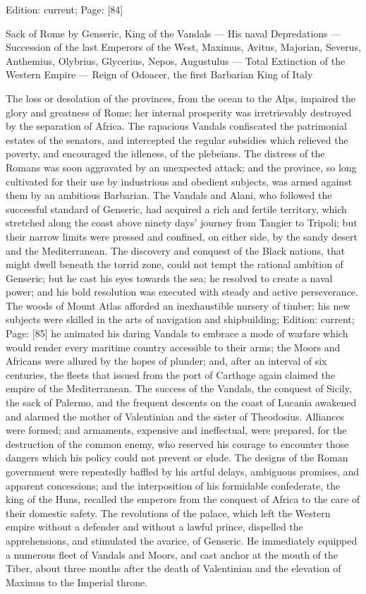 Edition: current; Page: [84]


Sack of Rome by Genseric, King of the Vandals \texthebrew{—} His naval Depredations \texthebrew{—} Succession of the last Emperors of the West, Maximus, Avitus, Majorian, Severus, Anthemius, Olybrius, Glycerius, Nepos, Augustulus \texthebrew{—} Total Extinction of the Western Empire \texthebrew{—} Reign of Odoacer, the first Barbarian King of Italy

The loss or desolation of the provinces, from the ocean to the Alps, impaired the glory and greatness of Rome; her internal prosperity was irretrievably destroyed by the separation of Africa. The rapacious Vandals confiscated the patrimonial estates of the senators, and intercepted the regular subsidies which relieved the poverty, and encouraged the idleness, of the plebeians. The distress of the Romans was soon aggravated by an unexpected attack; and the province, so long cultivated for their use by industrious and obedient subjects, was armed against them by an ambitious Barbarian. The Vandals and Alani, who followed the successful standard of Genseric, had acquired a rich and fertile territory, which stretched along the coast above ninety days\texthebrew{}’ journey from Tangier to Tripoli; but their narrow limits were pressed and confined, on either side, by the sandy desert and the Mediterranean. The discovery and conquest of the Black nations, that might dwell beneath the torrid zone, could not tempt the rational ambition of Genseric; but he cast his eyes towards the sea; he resolved to create a naval power; and his bold resolution was executed with steady and active perseverance. The woods of Mount Atlas afforded an inexhaustible nursery of timber; his new subjects were skilled in the arts of navigation and shipbuilding; Edition: current; Page: [85] he animated his daring Vandals to embrace a mode of warfare which would render every maritime country accessible to their arms; the Moors and Africans were allured by the hopes of plunder; and, after an interval of six centuries, the fleets that issued from the port of Carthage again claimed the empire of the Mediterranean. The success of the Vandals, the conquest of Sicily, the sack of Palermo, and the frequent descents on the coast of Lucania awakened and alarmed the mother of Valentinian and the sister of Theodosius. Alliances were formed; and armaments, expensive and ineffectual, were prepared, for the destruction of the common enemy, who reserved his courage to encounter those dangers which his policy could not prevent or elude. The designs of the Roman government were repeatedly baffled by his artful delays, ambiguous promises, and apparent concessions; and the interposition of his formidable confederate, the king of the Huns, recalled the emperors from the conquest of Africa to the care of their domestic safety. The revolutions of the palace, which left the Western empire without a defender and without a lawful prince, dispelled the apprehensions, and stimulated the avarice, of Genseric. He immediately equipped a numerous fleet of Vandals and Moors, and cast anchor at the mouth of the Tiber, about three months after the death of Valentinian and the elevation of Maximus to the Imperial throne.


